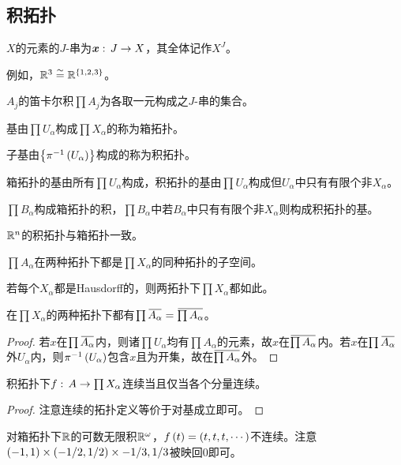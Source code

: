 \documentclass{ctexrep}
\begin{document}
  \subsection{积拓扑}
  \begin{definition}
    $X$的元素的$J$-串为$\boldsymbol{x}:\, J \rightarrow X$，其全体记作$X^J$。
  \end{definition}
  例如，$\mathbb{R}^3\overset{\sim}{=} \mathbb{R}^{\left\{1,2,3\right\}}$。
  \begin{definition}
    $A_j$的笛卡尔积$\prod A_j$为各取一元构成之$J$-串的集合。
  \end{definition}
  \begin{definition}
    基由$\prod U_\alpha$构成$\prod X_\alpha$的称为箱拓扑。
  \end{definition}
  \begin{definition}
    子基由$\left\{\pi^{-1}\left(U_{\alpha}\right)\right\}$构成的称为积拓扑。
  \end{definition}
  \begin{theorem}
    箱拓扑的基由所有$\prod U_\alpha$构成，积拓扑的基由$\prod U_\alpha$构成但$U_\alpha$中只有有限个非$X_\alpha$。
  \end{theorem}
  \begin{theorem}
    $\prod B_\alpha$构成箱拓扑的积，$\prod B_\alpha$中若$B_\alpha$中只有有限个非$X_\alpha$则构成积拓扑的基。
  \end{theorem}
  \begin{ex}
    $\mathbb{R}^n$的积拓扑与箱拓扑一致。
  \end{ex}
  \begin{theorem}
    $\prod A_\alpha$在两种拓扑下都是$\prod X_\alpha$的同种拓扑的子空间。
  \end{theorem}
  \begin{theorem}
    若每个$X_\alpha$都是Hausdorff的，则两拓扑下$\prod X_\alpha$都如此。
  \end{theorem}
  \begin{theorem}
    在$\prod X_\alpha$的两种拓扑下都有$\prod \clo{A_\alpha} = \clo{\prod A_\alpha}$。
  \end{theorem}
  \begin{proof}
    若$x$在$\prod \clo{A_\alpha}$内，则诸$\prod U_\alpha$均有$\prod A_\alpha$的元素，故$x$在$\clo{\prod A_\alpha}$内。若$x$在$\prod \clo{A_\alpha}$外$U_\alpha$内，则$\pi^{-1}\left(U_\alpha\right)$包含$x$且为开集，故在$\clo{\prod A_\alpha}$外。
  \end{proof}
  \begin{theorem}
    积拓扑下$f:\, A \rightarrow \prod X_\alpha$连续当且仅当各个分量连续。
  \end{theorem}
  \begin{proof}
    注意连续的拓扑定义等价于对基成立即可。
  \end{proof}  
  \begin{ex}
    对箱拓扑下$\mathbb{R}$的可数无限积$\mathbb{R}^\omega$，$f\left(t\right)=\left(t,t,t,\cdots\right)$不连续。注意$\left(-1,1\right)\times\left(-1/2,1/2\right)\times{-1/3,1/3}$被映回$0$即可。
  \end{ex}
\end{document}
